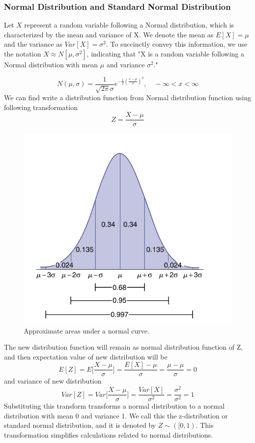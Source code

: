 \documentclass[12pt,a4paper]{article}
\theoremstyle{example}
\theoremstyle{definition}
\theoremstyle{theorem}
\begin{document}
\subsubsection{Normal Distribution and Standard Normal Distribution}
 Let $X$ represent a random variable following a Normal distribution, which is characterized by the mean and variance of X. We denote the mean as $E[X] = \mu$ and the variance as $Var[X] = \sigma^2$. To succinctly convey this information, we use the notation $X\approx N[\mu, \sigma^2]$, indicating that "X is a random variable following a Normal distribution with mean $\mu$ and variance $\sigma^2$."
 
\begin{equation}
     N(\mu, \sigma) = \frac{1}{\sqrt{2\pi}\sigma} e^{-\frac{1}{2}\left(\frac{x - \mu}{\sigma}\right)^2}, \quad -\infty< x < \infty 
\end{equation}
We can find write a distribution function from Normal distribution function using following transformation 
\begin{equation}
    Z=\frac{X-\mu}{\sigma}
    \label{tranform}
\end{equation}
\begin{figure}
    \centering
    \includegraphics[width=.6\textwidth]{2023-11-13 15-10-44.png}
    \caption{Approximate areas under a normal curve.}
    \label{normadist-label}
\end{figure}
\pagebreak 
The new distribution function will remain as normal distribution function of Z, and then expectation value of new distribution will be \\
$$ E[Z]=E\big[\frac{X-\mu}{\sigma}\big]=\frac{E[X]-\mu}{\sigma}=\frac{\mu-\mu}{\sigma}=0$$ and variance of new distribution 
$$Var[Z]= Var\big[\frac{X-\mu}{\sigma}\big]=\frac{Var[X]}{\sigma^2}=\frac{\sigma^2}{\sigma^2}=1$$
Substituting this transform transforms a normal distribution to a normal distribution with mean 0 and variance 1. We call this the z-distribution or standard normal distribution, and it is denoted by $Z\sim ([0,1)$. This transformation simplifies calculations related to normal distributions.
\end{document}
